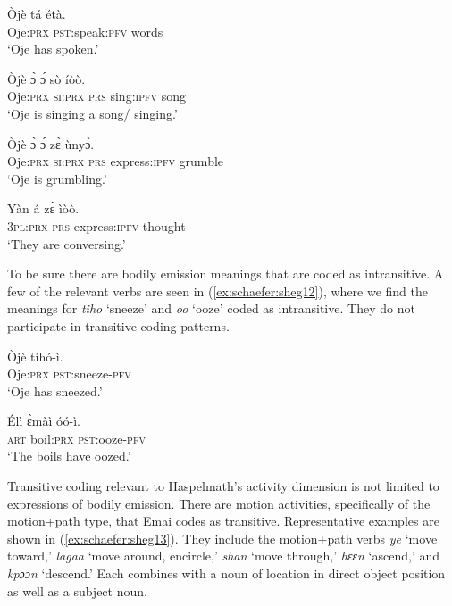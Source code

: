 \documentclass[output=paper,colorlinks,citecolor=brown
]{langscibook}
\begin{document}
 \ea \label{ex:schaefer:sheg11}
\begin{xlist}
\ex \label{ex:schaefer:sheg11a}
    \gll Òjè tá étà. \\
        Oje:\textsc{prx} \textsc{pst}:speak:\textsc{pfv} words \\
           \glt ‘Oje has spoken.’

\ex \label{ex:schaefer:sheg11b}
    \gll Òjè ɔ̀ ɔ́ sò íòò. \\
        Oje:\textsc{prx}   \textsc{si:prx} \textsc{prs} {sing:\textsc{ipfv}} song \\
           \glt ‘Oje is singing a song/ singing.’

\ex \label{ex:schaefer:sheg11c}
    \gll Òjè ɔ̀ ɔ́ zɛ̀ ùnyɔ̀. \\
        {Oje:\textsc{prx}} \textsc{si:prx} \textsc{prs} {express:\textsc{ipfv}} grumble \\
           \glt ‘Oje is grumbling.’

\ex \label{ex:schaefer:sheg11d}
    \gll Yàn á zɛ̀ ìòò.  \\
        {\textsc{3pl:prx}} \textsc{prs} {express:\textsc{ipfv}} thought \\
           \glt ‘They are conversing.’
    
\end{xlist}
\z	

To be sure there are bodily emission meanings that are coded as intransitive. A few of the relevant verbs are seen in (\ref{ex:schaefer:sheg12}), where we find the meanings for \textit{tiho} ‘sneeze’ and \textit{oo} ‘ooze’ coded as intransitive. They do not participate in transitive coding patterns.  

 \ea \label{ex:schaefer:sheg12}
\begin{xlist}
\ex \label{ex:schaefer:sheg12a}
    \gll Òjè tíhó-ì. \\
        Oje:\textsc{prx} {\textsc{pst}:sneeze-\textsc{pfv}} \\
           \glt ‘Oje has sneezed.’

\ex \label{ex:schaefer:sheg12b}
    \gll Élì ɛ̀màì óó-ì. \\
        \textsc{art} {boil:\textsc{prx}} {\textsc{pst}:ooze-\textsc{pfv}} \\
           \glt ‘The boils have oozed.’
    
\end{xlist}
\z	

Transitive coding relevant to Haspelmath’s activity dimension is not limited to expressions of bodily emission. There are motion activities, specifically of the motion+path type, that Emai codes as transitive. Representative examples are shown in (\ref{ex:schaefer:sheg13}). They include the motion+path verbs \textit{ye} ‘move toward,’ \textit{lagaa} ‘move around, encircle,’ \textit{shan} ‘move through,’ \textit{hɛɛn} ‘ascend,’ and \textit{kpɔɔn} ‘descend.’ Each combines with a noun of location in direct object position as well as a subject noun.  
\end{document}
